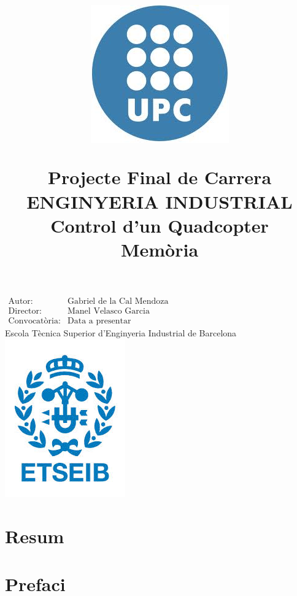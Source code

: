 \documentclass[twoside]{article}
\title{\begin{center} 
\includegraphics[scale=0.3]{upc.jpg} 
\end{center} 
\vspace{1cm} 
Projecte Final de Carrera\\
ENGINYERIA INDUSTRIAL \\
\vspace{1.5cm} 
\Huge{Control d'un Quadcopter} 
\vspace{2cm} \\ 
Memòria}
\date{}
\begin{document}
\maketitle
\begin{center}
\large{
$\begin{array}{ll}
\mbox{Autor:} & \mbox{Gabriel de la Cal Mendoza} \\
\mbox{Director:} & \mbox{Manel Velasco Garcia} \\
\mbox{Convocatòria:} & \mbox{Data a presentar}
\end{array}$}
\\ \vspace{2cm} \Large{Escola Tècnica Superior d'Enginyeria Industrial de Barcelona}\\ \vspace{1cm}
\includegraphics[scale=0.4]{etseib.jpg}
\end{center}

\thispagestyle{empty}
\newpage
\begin{center}

\end{center}
\thispagestyle{empty}
\newpage
\setcounter{page}{1}
\section*{Resum}
\newpage
\begin{center}

\end{center}
\thispagestyle{empty}
\newpage

\setcounter{page}{1}
\tableofcontents
{}
\fancyfoot[C]{}
\newpage
\fancyhead[LE,RO]{\thepage}
\setcounter{page}{4}
\listoffigures
\newpage

\section{Prefaci} 
\end{document}
